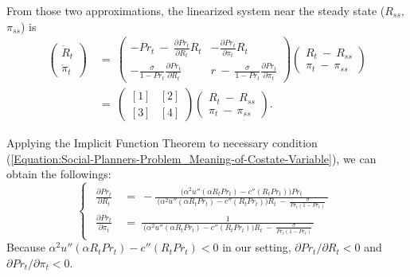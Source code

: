 From those two approximations, the linearized system near the steady state ($R_{ss}$, $\pi_{ss}$) is
\begin{equation*}
\begin{split}
    \begin{pmatrix}
        \dot{R}_{t} \\
        \dot{\pi}_{t}
    \end{pmatrix} \ 
    & = \ 
    \begin{pmatrix}
        -Pr_{t} \ - \ \frac{\partial Pr_{t}}{\partial R_{t}} R_{t} & -\frac{\partial Pr_{t}}{\partial \pi_{t}} R_{t} \\
        -\frac{\sigma}{1 - Pr_{t}} \frac{\partial Pr_{t}}{\partial R_{t}} & r \ - \ \frac{\sigma}{1 - Pr_{t}} \frac{\partial Pr_{t}}{\partial \pi_{t}}
    \end{pmatrix}
    \begin{pmatrix}
        R_{t} \ - \ R_{ss} \\
        \pi_{t} \ - \ \pi_{ss}
    \end{pmatrix} \\
    & = \
    \begin{pmatrix}
        [1] & [2] \\
        [3] & [4]
    \end{pmatrix}
    \begin{pmatrix}
        R_{t} \ - \ R_{ss} \\
        \pi_{t} \ - \ \pi_{ss}
    \end{pmatrix}.
\end{split}
\end{equation*}

Applying the Implicit Function Theorem to necessary condition (\ref{Equation:Social-Planners-Problem_Meaning-of-Costate-Variable}), we can obtain the followings:
\begin{equation*}
\begin{cases}
    \begin{split}
        \frac{\partial Pr_{t}}{\partial R_{t}} \ 
        & = \ - \frac{ \big( \alpha^{2} u''(\alpha R_{t} Pr_{t}) - c''(R_{t} Pr_{t}) \big) Pr_{t}}{ \ \big( \alpha^{2} u''(\alpha R_{t} Pr_{t}) - c''(R_{t} Pr_{t}) \big) R_{t} \ - \ \frac{\sigma}{Pr_{t}(1 - Pr_{t})} \ } \\
        \frac{\partial Pr_{t}}{\partial \pi_{t}} \
        & = \ \frac{1}{ \ \big( \alpha^{2} u''(\alpha R_{t} Pr_{t}) - c''(R_{t} Pr_{t}) \big) R_{t} \ - \ \frac{\sigma}{Pr_{t}(1 - Pr_{t})} \ } 
    \end{split}
\end{cases}
\end{equation*}
Because $\alpha^{2} u''(\alpha R_{t} Pr_{t}) - c''(R_{t} Pr_{t}) < 0$ in our setting, $\partial Pr_{t} / \partial R_{t} < 0$ and $\partial Pr_{t} / \partial \pi_{t} < 0$.

